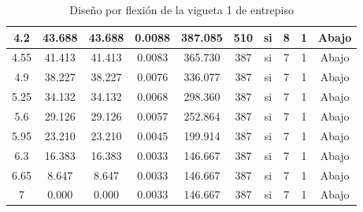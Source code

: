 \begin{table}[H]
{\begin{tabular}{|c|c|c|c|c|c|c|c|c|c|}
    \hline
    4.2 & 43.688 & 43.688 & 0.0088 & 387.085 & 510 & si  & 8   & 1   & Abajo \bigstrut\\
    \hline
    4.55 & 41.413 & 41.413 & 0.0083 & 365.730 & 387 & si  & 7   & 1   & Abajo \bigstrut\\
    \hline
    4.9 & 38.227 & 38.227 & 0.0076 & 336.077 & 387 & si  & 7   & 1   & Abajo \bigstrut\\
    \hline
    5.25 & 34.132 & 34.132 & 0.0068 & 298.360 & 387 & si  & 7   & 1   & Abajo \bigstrut\\
    \hline
    5.6 & 29.126 & 29.126 & 0.0057 & 252.864 & 387 & si  & 7   & 1   & Abajo \bigstrut\\
    \hline
    5.95 & 23.210 & 23.210 & 0.0045 & 199.914 & 387 & si  & 7   & 1   & Abajo \bigstrut\\
    \hline
    6.3 & 16.383 & 16.383 & 0.0033 & 146.667 & 387 & si  & 7   & 1   & Abajo \bigstrut\\
    \hline
    6.65 & 8.647 & 8.647 & 0.0033 & 146.667 & 387 & si  & 7   & 1   & Abajo \bigstrut\\
    \hline
    7   & 0.000 & 0.000 & 0.0033 & 146.667 & 387 & si  & 7   & 1   & Abajo \bigstrut\\
    \hline
    \end{tabular}%
   }%
      \caption{Diseño por flexión de la vigueta 1 de entrepiso}
  \label{tab:F VT1 EP}%
\end{table}%
